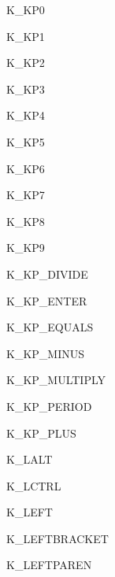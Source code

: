\begin{datadesc}{K_KP0}
\end{datadesc}
\begin{datadesc}{K_KP1}
\end{datadesc}
\begin{datadesc}{K_KP2}
\end{datadesc}
\begin{datadesc}{K_KP3}
\end{datadesc}
\begin{datadesc}{K_KP4}
\end{datadesc}
\begin{datadesc}{K_KP5}
\end{datadesc}
\begin{datadesc}{K_KP6}
\end{datadesc}
\begin{datadesc}{K_KP7}
\end{datadesc}
\begin{datadesc}{K_KP8}
\end{datadesc}
\begin{datadesc}{K_KP9}
\end{datadesc}
\begin{datadesc}{K_KP_DIVIDE}
\end{datadesc}
\begin{datadesc}{K_KP_ENTER}
\end{datadesc}
\begin{datadesc}{K_KP_EQUALS}
\end{datadesc}
\begin{datadesc}{K_KP_MINUS}
\end{datadesc}
\begin{datadesc}{K_KP_MULTIPLY}
\end{datadesc}
\begin{datadesc}{K_KP_PERIOD}
\end{datadesc}
\begin{datadesc}{K_KP_PLUS}
\end{datadesc}
\begin{datadesc}{K_LALT}
\end{datadesc}
\begin{datadesc}{K_LCTRL}
\end{datadesc}
\begin{datadesc}{K_LEFT}
\end{datadesc}
\begin{datadesc}{K_LEFTBRACKET}
\end{datadesc}
\begin{datadesc}{K_LEFTPAREN}
\end{datadesc}

